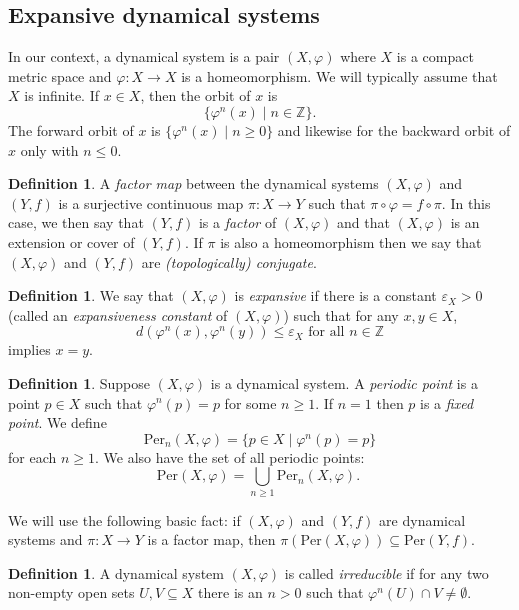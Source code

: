 \documentclass{amsart}
\newcommand{\Per}{\text{Per}}
\newcommand{\parens}[1]{\left( #1 \right)}
\theoremstyle{plain}
\theoremstyle{definition}
\newtheorem{definition}[theorem]{Definition}
\theoremstyle{remark}
\begin{document}
\subsection{Expansive dynamical systems}
In our context, a dynamical system is a pair $(X, \varphi)$ where $X$ is a compact metric space and $\varphi: X \rightarrow X$ is a homeomorphism. We will typically assume that $X$ is infinite. If $x\in X$, then the orbit of $x$ is 
\[ \{ \varphi^n(x) \mid n \in \mathbb{Z} \}.  \]
The forward orbit of $x$ is $\{ \varphi^n(x) \mid n \ge 0 \}$ and likewise for the backward orbit of $x$ only with $n\le 0$.
\begin{definition}\label{def:factor}
A \emph{factor map} between the dynamical systems $(X,\varphi)$ and $(Y, f)$ is a surjective continuous map $\pi : X \to Y$ such that $\pi \circ \varphi  = f\circ \pi$. In this case, we then say that $(Y, f)$ is a \emph{factor} of $(X,\varphi)$ and that $(X, \varphi)$ is an extension or cover of $(Y, f)$.  If $\pi$ is also a homeomorphism then we say that $(X,\varphi)$ and $(Y, f)$ are \emph{(topologically) conjugate}.
\end{definition}
\begin{definition}\label{def:expansiveness}
We say that $(X,\varphi)$ is \emph{expansive} if there is a constant $\varepsilon_X > 0$ (called an \emph{expansiveness constant} of $(X,\varphi)$) such that for any $x,y \in X$, \[ d(\varphi^n(x),\varphi^n(y)) \leq \varepsilon_X \text{ for all } n \in \mathbb{Z} \] implies $x = y$.
\end{definition}
\begin{definition}\label{def:periodic}
Suppose $(X,\varphi)$ is a dynamical system.  A \emph{periodic point} is a point $p \in X$ such that $\varphi^n(p) = p$ for some $n \geq 1$.  If $n = 1$ then $p$ is a \emph{fixed point}.  We define \[ \Per_n(X,\varphi) = \{ p \in X \mid \varphi^n(p) = p \} \] for each $n \geq 1$.  We also have the set of all periodic points: 
\[ \Per(X,\varphi) = \bigcup_{n \geq 1} \Per_n(X,\varphi). \ \]
\end{definition}
We will use the following basic fact: if $(X,\varphi)$ and $(Y,f)$ are dynamical systems and $\pi : X \to Y$ is a factor map, then $\pi\parens{\Per(X,\varphi)} \subseteq \Per(Y,f)$.  

\begin{definition} \label{def:Irreducible}
A dynamical system $(X,\varphi)$ is called \emph{irreducible} if for any two non-empty open sets $U, V \subseteq X$ there is an $n > 0$ such that $\varphi^n(U) \cap V \neq \emptyset$.
\end{definition}
\end{document}
